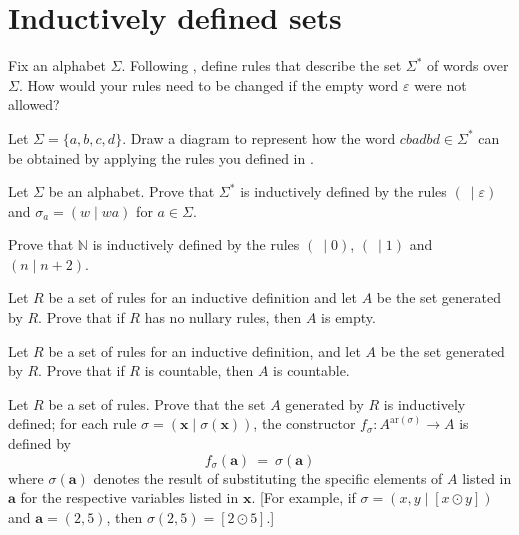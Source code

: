 \section{Inductively defined sets}
\label{secStructuralInduction}


\begin{exercise}
\label{exRulesForInductiveDefinitionOfWords}
Fix an alphabet $\Sigma$. Following , define rules that describe the set $\Sigma^*$ of words over $\Sigma$. How would your rules need to be changed if the empty word $\varepsilon$ were not allowed?
\end{exercise}


\begin{exercise}
Let $\Sigma = \{ a,b,c,d \}$. Draw a diagram to represent how the word $cbadbd \in \Sigma^*$ can be obtained by applying the rules you defined in .
\end{exercise}


\begin{exercise}
Let $\Sigma$ be an alphabet. Prove that $\Sigma^*$ is inductively defined by the rules $(~ \mid \varepsilon)$ and $\sigma_a = (w \mid wa)$ for $a \in \Sigma$.
\end{exercise}

\begin{exercise}
Prove that $\mathbb{N}$ is inductively defined by the rules $(~ \mid 0)$, $(~ \mid 1)$ and $(n \mid n+2)$.
\end{exercise}


\begin{exercise}
Let $R$ be a set of rules for an inductive definition and let $A$ be the set generated by $R$. Prove that if $R$ has no nullary rules, then $A$ is empty.
\end{exercise}

\begin{exercise}
Let $R$ be a set of rules for an inductive definition, and let $A$ be the set generated by $R$. Prove that if $R$ is countable, then $A$ is countable.
\end{exercise}

\begin{exercise}
\label{exSetGeneratedByRulesIsInductivelyDefined}
Let $R$ be a set of rules. Prove that the set $A$ generated by $R$ is inductively defined; for each rule $\sigma = (\mathbf{x} \mid \sigma(\mathbf{x}))$, the constructor $f_{\sigma} : A^{\mathrm{ar}(\sigma)} \to A$ is defined by
\[ f_{\sigma}(\mathbf{a}) ~=~ \sigma(\mathbf{a}) \]
where $\sigma(\mathbf{a})$ denotes the result of substituting the specific elements of $A$ listed in $\mathbf{a}$ for the respective variables listed in $\mathbf{x}$. [For example, if $\sigma = (x,y \mid [x \odot y])$ and $\mathbf{a} = (2,5)$, then $\sigma(2,5) = [2 \odot 5]$.]
\end{exercise}


